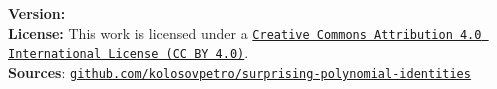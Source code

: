 \noindent \textbf{Version:} 
\\[1em]
\noindent \textbf{License:} This work is licensed under a
\href{https://creativecommons.org/licenses/by/4.0/}
{\texttt{Creative Commons Attribution 4.0 International License (CC BY 4.0)}}.
\\[1em]
\noindent \textbf{Sources}:
\href{https://github.com/kolosovpetro/unexpected-polynomial-identities-classical-interpolation}
{\texttt{github.com/kolosovpetro/surprising-polynomial-identities}}
